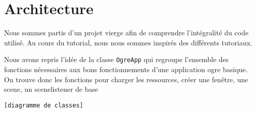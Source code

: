 \section{Architecture}
Nous sommes partis d'un projet vierge afin de comprendre l'intégralité du code
utilisé. Au cours du tutorial, nous nous sommes inspirés des différents
tutoriaux.

Nous avons repris l'idée de la classe \texttt{OgreApp} qui regroupe l'ensemble
des fonctions nécessaires aux bons fonctionnements d'une application ogre
basique. On trouve donc les fonctions pour charger les ressources, créer une
fenêtre, une scene, un scenelistener de base  

\verb![diagramme de classes]!
